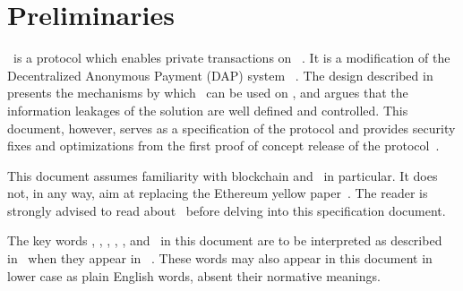 
\chapter{Preliminaries}\label{chap:preliminaries}

\zeth~is a protocol which enables private transactions on \ethereum~\cite{ethyellowpaper}. It is a modification of the Decentralized Anonymous Payment (DAP) system \zerocash~\cite{sasson2014zerocash}. The design described in~\cite{zethpaper} presents the mechanisms by which \zerocash~can be used on \ethereum, and argues that the information leakages of the solution are well defined and controlled. This document, however, serves as a specification of the protocol and provides security fixes and optimizations from the first proof of concept release of the protocol~\cite{zethsproken}.

\medskip

This document assumes familiarity with blockchain and \ethereum~in particular. It does not, in any way, aim at replacing the Ethereum yellow paper~\cite{ethyellowpaper}. The reader is strongly advised to read about \ethereum~before delving into this specification document.

\medskip

The key words \MUST, \MUSTNOT, \SHOULD, \SHOULDNOT, \MAY, and \RECOMMENDED~in this document are to be interpreted as described in~\cite{rfc2119} when they appear in \ALLCAPS~. These words may also appear in this document in lower case as plain English words, absent their normative meanings.

